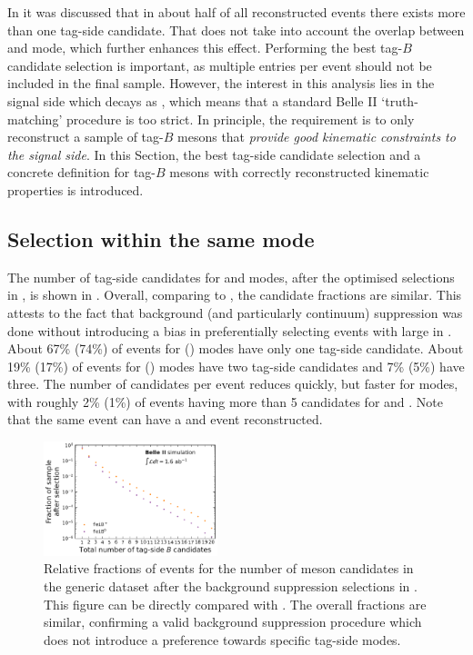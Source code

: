 In  it was discussed that in about half of all reconstructed events there exists more than one tag-side candidate.
That does not take into account the overlap between \feiBp and \feiBz mode, which further enhances this effect.
Performing the best tag-$B$ candidate selection is important, as multiple entries per event should not be included in the final sample.
However, the interest in this analysis lies in the signal side which decays as \BtoXsgamma, which means that a standard Belle II `truth-matching' procedure is too strict.
In principle, the requirement is to only reconstruct a sample of tag-$B$ mesons that \textit{provide good kinematic constraints to the signal side}.
In this Section, the best tag-side candidate selection and
a concrete definition for tag-$B$ mesons with correctly reconstructed kinematic properties is introduced.

\subsection{Selection within the same \texorpdfstring{\FEI}{FEI} mode}\label{sec:select_tag_between_modes}

The number of tag-side candidates for \feiBp and \feiBz modes, after the optimised selections in ,
is shown in .
Overall, comparing to , the candidate fractions are similar.
This attests to the fact that background (and particularly continuum) suppression was done without introducing a bias in preferentially selecting events with large \feiProb in .
About 67\% (74\%) of events for \feiBp (\feiBz) modes have only one tag-side candidate.
About 19\% (17\%) of events for \feiBp (\feiBz) modes have two tag-side candidates and 7\% (5\%) have three.
The number of candidates per event reduces quickly, but faster for \Bz modes, 
with roughly 2\% (1\%) of events having more than 5 candidates for \Bp and \Bz.
Note that the same event can have a \Bp and \Bz event reconstructed.

\begin{figure}[htbp!]
    \centering
    \includegraphics[width=0.45\textwidth]{figures/event_reconstruction/Bboth_total_tag_candidates.pdf}
    \caption{\label{fig:fei_tag_reco_candidates_post_optimisation} 
    Relative fractions of events for the number of \B meson candidates in the generic \MC dataset after the background suppression selections in .
    This figure can be directly compared with .
    The overall fractions are similar, confirming a valid background suppression procedure which does not introduce a preference towards specific tag-side modes.
    }
\end{figure}

